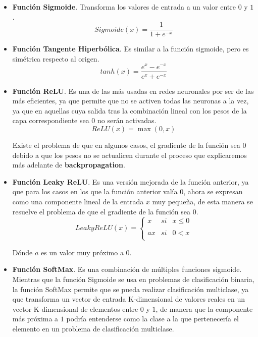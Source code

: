             \begin{itemize}
                \item \textbf{Función Sigmoide}. Transforma los valores de entrada a un valor entre $0$ y $1$.
                \begin{equation}
                    Sigmoide(x)=\frac{1}{1+e^{-x}}
                \end{equation}
                \item \textbf{Función Tangente Hiperbólica}. Es similar a la función sigmoide, pero es simétrica respecto al origen. 
                \begin{equation}
                    tanh(x)=\frac{e^x - e^{-x}}{e^x + e^{-x}} 
                \end{equation}
                \item \textbf{Función ReLU}. Es una de las más usadas en redes neuronales por ser de las más eficientes, ya que permite que no se activen todas las neuronas a la vez, ya que en aquellas cuya salida tras la combinación lineal con los pesos de la capa correspondiente sea 0 no serán activadas.
                \begin{equation}
                    ReLU(x)=\max(0,x)
                \end{equation}

                \noindent Existe el problema de que en algunos casos, el gradiente de la función sea $0$ debido a que los pesos no se actualicen durante el proceso que explicaremos más adelante de \textbf{backpropagation}.

                \item \textbf{Función Leaky ReLU}. Es una versión mejorada de la función anterior, ya que para los casos en los que la función anterior valía $0$, ahora se expresan como una componente lineal de la entrada $x$ muy pequeña, de esta manera se resuelve el problema de que el gradiente de la función sea $0$. 
                \begin{equation}
                    LeakyReLU(x)=\left\{ \begin{array}{lcc}
                        x &   si  & x \leq 0 \\
                        \\ ax &  si & 0 < x \\
                        \end{array}
                    \right.
                \end{equation}

                \noindent Dónde $a$ es un valor muy próximo a $0$.
                \item \textbf{Función SoftMax}. Es una combinación de múltiples funciones sigmoide. Mientras que la función Sigmoide se usa en problemas de clasificación binaria, la función SoftMax permite que se pueda realizar clasificación multiclase, ya que transforma un vector de entrada K-dimensional de valores reales en un vector K-dimensional de elementos entre $0$ y $1$, de manera que la componente más próxima a $1$ podría entenderse como la clase a la que pertenecería el elemento en un problema de clasificación multiclase.
                

\end{itemize}
